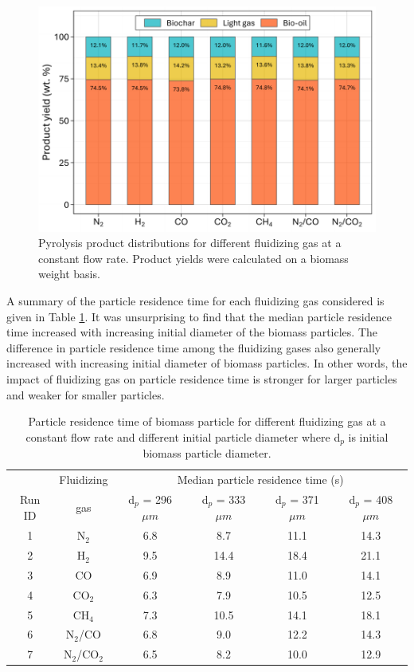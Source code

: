 \begin{figure}[H]
    \centering
    \includegraphics[width=1.0\textwidth]{figures/cfd-product-yield.pdf}
    \caption{Pyrolysis product distributions for different fluidizing gas at a constant flow rate. Product yields were calculated on a biomass weight basis.}
    \label{fig:cfd-product-yield}
\end{figure}

A summary of the particle residence time for each fluidizing gas considered is given in Table \ref{tab:particle-restime}. It was unsurprising to find that the median particle residence time increased with increasing initial diameter of the biomass particles. The difference in particle residence time among the fluidizing gases also generally increased with increasing initial diameter of biomass particles. In other words, the impact of fluidizing gas on particle residence time is stronger for larger particles and weaker for smaller particles.

\begin{table}[H]
    \centering
    \caption{Particle residence time of biomass particle for different fluidizing gas at a constant flow rate and different initial particle diameter where d$_p$ is initial biomass particle diameter.}
    \label{tab:particle-restime}
    \begin{tabular}{cccccc}
        \toprule
               & Fluidizing & \multicolumn{4}{c}{Median particle residence time (s)} \\
        Run ID & gas        & d$_p$ = 296 $\mu m$ & d$_p$ = 333 $\mu m$ & d$_p$ = 371 $\mu m$ & d$_p$ = 408 $\mu m$ \\
        \midrule
        1 & N$_2$        & 6.8 & 8.7  & 11.1  & 14.3 \\
        2 & H$_2$        & 9.5 & 14.4 & 18.4 & 21.1 \\
        3 & CO           & 6.9 & 8.9  & 11.0  & 14.1 \\
        4 & CO$_2$       & 6.3 & 7.9  & 10.5  & 12.5 \\
        5 & CH$_4$       & 7.3 & 10.5  & 14.1 & 18.1 \\
        6 & N$_2$/CO     & 6.8 & 9.0  & 12.2  & 14.3 \\
        7 & N$_2$/CO$_2$ & 6.5 & 8.2  & 10.0  & 12.9 \\
        \bottomrule
    \end{tabular}
\end{table}

